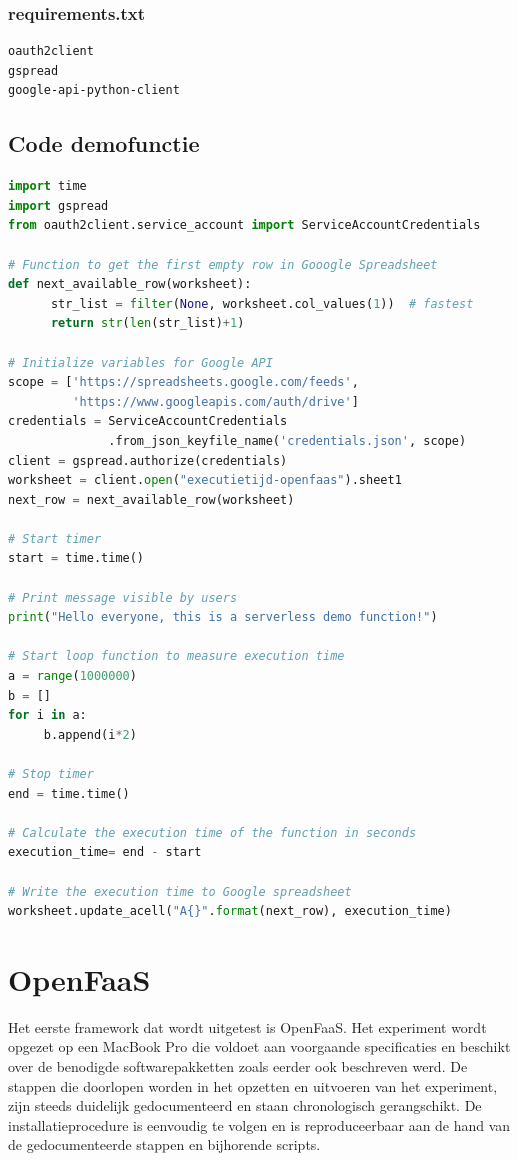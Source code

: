 \subsubsection{requirements.txt}
\begin{lstlisting}
oauth2client
gspread
google-api-python-client
\end{lstlisting}

\subsection{Code demofunctie}
\begin{lstlisting}[language=python]
import time
import gspread
from oauth2client.service_account import ServiceAccountCredentials

# Function to get the first empty row in Gooogle Spreadsheet
def next_available_row(worksheet):
      str_list = filter(None, worksheet.col_values(1))  # fastest
      return str(len(str_list)+1)

# Initialize variables for Google API
scope = ['https://spreadsheets.google.com/feeds',
         'https://www.googleapis.com/auth/drive']
credentials = ServiceAccountCredentials
              .from_json_keyfile_name('credentials.json', scope)
client = gspread.authorize(credentials)
worksheet = client.open("executietijd-openfaas").sheet1
next_row = next_available_row(worksheet)

# Start timer 
start = time.time()

# Print message visible by users
print("Hello everyone, this is a serverless demo function!")

# Start loop function to measure execution time
a = range(1000000)
b = []
for i in a:
     b.append(i*2)

# Stop timer
end = time.time()

# Calculate the execution time of the function in seconds
execution_time= end - start

# Write the execution time to Google spreadsheet
worksheet.update_acell("A{}".format(next_row), execution_time)
\end{lstlisting}


\section{OpenFaaS}
Het eerste framework dat wordt uitgetest is OpenFaaS. Het experiment wordt opgezet op een MacBook Pro die voldoet aan voorgaande specificaties en beschikt over de benodigde softwarepakketten zoals eerder ook beschreven werd. De stappen die doorlopen worden in het opzetten en uitvoeren van het experiment, zijn steeds duidelijk gedocumenteerd en staan chronologisch gerangschikt. De installatieprocedure is eenvoudig te volgen en is reproduceerbaar aan de hand van de gedocumenteerde stappen en bijhorende scripts.

